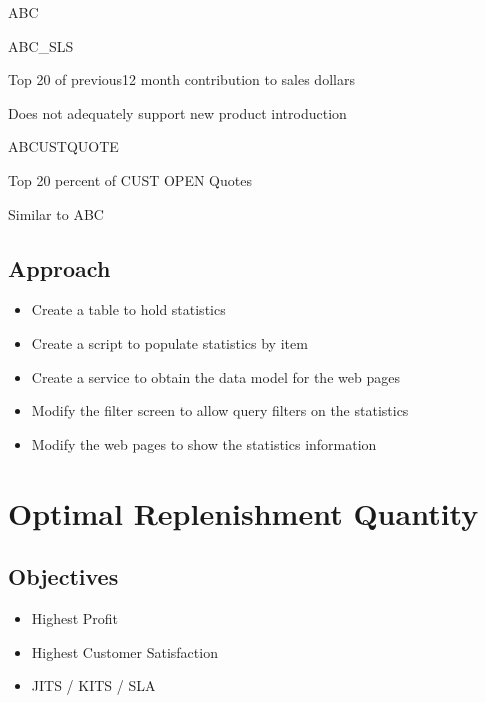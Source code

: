 \documentclass[letterpaper,10pt,english]{sphinxmanual}
\begin{document}
ABC

ABC\_SLS

Top 20 of previous12 month contribution to sales dollars

Does not adequately support new product introduction

ABCUSTQUOTE

Top 20 percent of CUST OPEN Quotes

Similar to ABC


\section{Approach}
\label{Portal/100-ABC:id7}\begin{itemize}
\item {} 
Create a table to hold statistics

\item {} 
Create a script to populate statistics by item

\item {} 
Create a service to obtain the data model for the web pages

\item {} 
Modify the filter screen to allow query filters on the statistics

\item {} 
Modify the web pages to show the statistics information

\end{itemize}


\chapter{Optimal Replenishment Quantity}
\label{Portal/200-OptimalReplenishmentQuantity::doc}\label{Portal/200-OptimalReplenishmentQuantity:optimal-replenishment-quantity}

\section{Objectives}
\label{Portal/200-OptimalReplenishmentQuantity:objectives}\begin{itemize}
\item {} 
Highest Profit

\item {} 
Highest Customer Satisfaction

\item {} 
JITS / KITS / SLA

\end{itemize}
\end{document}
